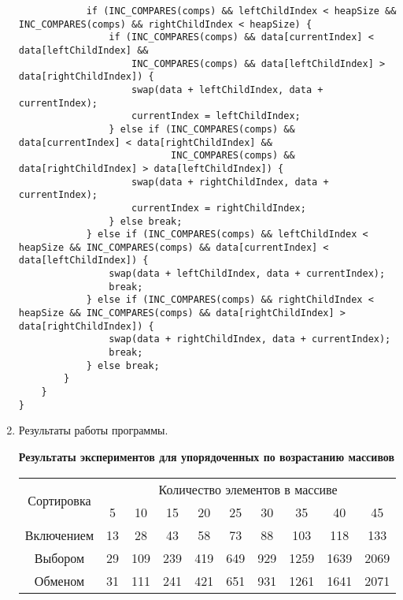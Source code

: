 \documentclass[a4paper,14pt]{extarticle}
\begin{document}
\begin{enumerate}
\begin{verbatim}
            if (INC_COMPARES(comps) && leftChildIndex < heapSize && INC_COMPARES(comps) && rightChildIndex < heapSize) {
                if (INC_COMPARES(comps) && data[currentIndex] < data[leftChildIndex] && 
                    INC_COMPARES(comps) && data[leftChildIndex] > data[rightChildIndex]) {
                    swap(data + leftChildIndex, data + currentIndex);
                    currentIndex = leftChildIndex;
                } else if (INC_COMPARES(comps) && data[currentIndex] < data[rightChildIndex] && 
                           INC_COMPARES(comps) && data[rightChildIndex] > data[leftChildIndex]) {
                    swap(data + rightChildIndex, data + currentIndex);
                    currentIndex = rightChildIndex;
                } else break;
            } else if (INC_COMPARES(comps) && leftChildIndex < heapSize && INC_COMPARES(comps) && data[currentIndex] < data[leftChildIndex]) {
                swap(data + leftChildIndex, data + currentIndex);
                break;
            } else if (INC_COMPARES(comps) && rightChildIndex < heapSize && INC_COMPARES(comps) && data[rightChildIndex] > data[rightChildIndex]) {
                swap(data + rightChildIndex, data + currentIndex);
                break;
            } else break;
        }
    }
}
	\end{verbatim}
	\item Результаты работы программы.
	      \begin{center}
		      \textbf{Результаты экспериментов для упорядоченных по возрастанию массивов}
		      \begin{tabular}{|c|c|c|c|c|c|c|c|c|c|}
			      \hline
			      \multirow{2}{*}{Сортировка} & \multicolumn{9}{|c|}{Количество элементов в массиве}                                                    \\
			      \cline{2-10}
			                                  & 5                                                    & 10  & 15  & 20  & 25  & 30  & 35   & 40   & 45   \\
			      \hline
			      Включением                  & 13                                                   & 28  & 43  & 58  & 73  & 88  & 103  & 118  & 133  \\
			      \hline
			      Выбором                     & 29                                                   & 109 & 239 & 419 & 649 & 929 & 1259 & 1639 & 2069 \\
			      \hline
			      Обменом                     & 31                                                   & 111 & 241 & 421 & 651 & 931 & 1261 & 1641 & 2071 \\

\end{tabular}
\end{center}
\end{enumerate}
\end{document}
